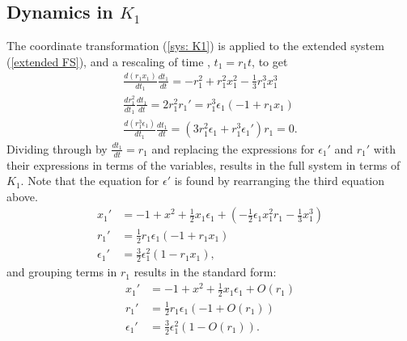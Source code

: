 \subsection{Dynamics in \texorpdfstring{$K_1$}{K1}}\label{sec:dynamics-in-texorpdfstringk1k1} 
The coordinate transformation (\ref{sys: K1}) is applied to the extended system (\ref{extended FS}), and a rescaling of time , $t_1=r_1t$, to get
\begin{align*}
\frac{d(r_1x_1)}{dt_1} \frac{dt_1}{dt} = -r_1^2 + r_1^2x_1^2 - \frac{1}{3}r_1^3x_1^3\\
\frac{dr_1^2}{dt_1}\frac{dt_1}{dt}= 2r_1^2r_1' = r_1^3 \epsilon_1 (-1 +r_1 x_1)\\
\frac{d(r_1^3 \epsilon_1)}{dt_1}\frac{dt_1}{dt}= (3r_1^2\epsilon_1 + r_1^3 \epsilon_1') r_1 = 0.
\end{align*}
Dividing through by $\frac{dt_1}{dt}=r_1$ and replacing the expressions for $\epsilon_1'$ and $r_1'$ with their expressions in terms of the variables, results in the full system in terms of $K_1$. Note that the equation for $\epsilon'$ is found by rearranging the third equation above. 
\begin{align*}
x_1' &= -1 +x^2 + \frac{1}{2} x_1 \epsilon_1 + \left( - \frac{1}{2} \epsilon_1 x_1^2r_1 - \frac{1}{3} x_1^3 \right)\\
r_1' &= \frac{1}{2} r_1 \epsilon_1( -1 + r_1 x_1)\\
\epsilon_1' &= \frac{3}{2} \epsilon_1^2 ( 1- r_1x_1),
\end{align*}
and grouping terms in $r_1$ results in the standard form:
\begin{equation}
\begin{aligned} \label{K1systemfull}
x_1' &= -1 +x^2 + \frac{1}{2} x_1 \epsilon_1 +O(r_1)\\
r_1' &= \frac{1}{2} r_1 \epsilon_1( -1 + O(r_1))\\
\epsilon_1' &= \frac{3}{2} \epsilon_1^2 ( 1- O(r_1)).
\end{aligned}
\end{equation}

